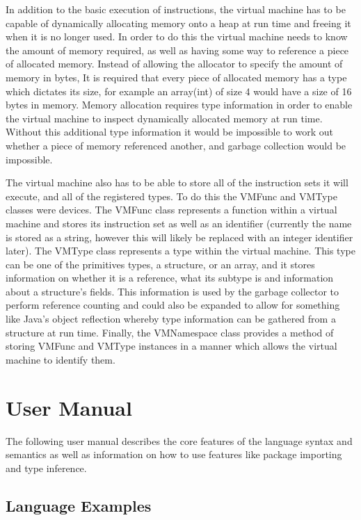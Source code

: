 \documentclass[]{final_report}
\begin{document}
In addition to the basic execution of instructions, the virtual machine has to be capable of dynamically allocating memory onto a heap at run time and freeing it when it is no longer used. In order to do this the virtual machine needs to know the amount of memory required, as well as having some way to reference a piece of allocated memory. Instead of allowing the allocator to specify the amount of memory in bytes, It is required that every piece of allocated memory has a type which dictates its size, for example an array(int) of size 4 would have a size of 16 bytes in memory. Memory allocation requires type information in order to enable the virtual machine to inspect dynamically allocated memory at run time. Without this additional type information it would be impossible to work out whether a piece of memory referenced another, and garbage collection would be impossible.

The virtual machine also has to be able to store all of the instruction sets it will execute, and all of the registered types. To do this the VMFunc and VMType classes were devices. The VMFunc class represents a function within a virtual machine and stores its instruction set as well as an identifier (currently the name is stored as a string, however this will likely be replaced with an integer identifier later). The VMType class represents a type within the virtual machine. This type can be one of the primitives types, a structure, or an array, and it stores information on whether it is a reference, what its subtype is and information about a structure's fields. This information is used by the garbage collector to perform reference counting and could also be expanded to allow for something like Java's object reflection whereby type information can be gathered from a structure at run time. Finally, the VMNamespace class provides a method of storing VMFunc and VMType instances in a manner which allows the virtual machine to identify them.

\chapter{User Manual}

The following user manual describes the core features of the language syntax and semantics as well as information on how to use features like package importing and type inference.

\section{Language Examples}
\end{document}
